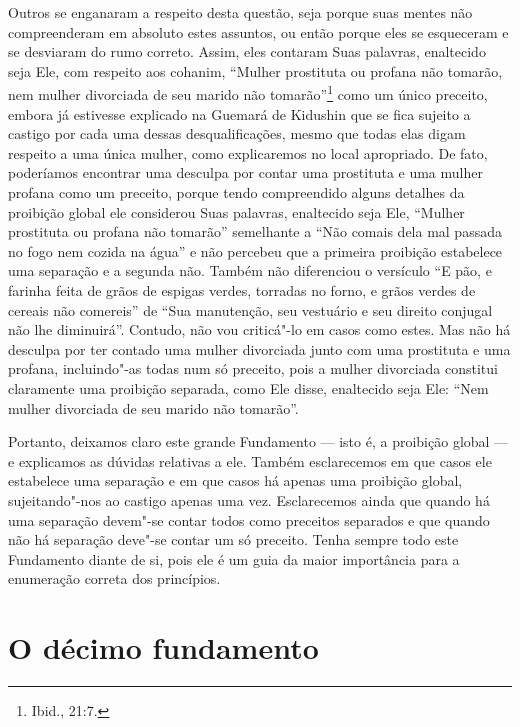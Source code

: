 Outros se enganaram a respeito desta questão, seja porque suas mentes
não compreenderam em absoluto estes assuntos, ou então porque eles se
esqueceram e se desviaram do rumo correto. Assim, eles contaram Suas
palavras, enaltecido seja Ele, com respeito aos cohanim\starr, ``Mulher
prostituta ou profana não tomarão, nem mulher divorciada de seu marido
não tomarão''\footnote{Ibid., 21:7.} como um único preceito, embora já estivesse
explicado na Guemará\starr{} de Kidushin\starr{} que se fica sujeito a castigo por cada
uma dessas desqualificações, mesmo que todas elas digam respeito a uma
única mulher, como explicaremos no local apropriado. De fato, poderíamos
encontrar uma desculpa por contar uma
prostituta e uma mulher profana como um preceito, porque tendo
compreendido alguns detalhes da proibição global ele considerou Suas
palavras, enaltecido seja Ele, ``Mulher prostituta ou profana não
tomarão'' semelhante a ``Não comais dela mal passada no fogo nem cozida
na água'' e não percebeu que a primeira proibição estabelece uma
separação e a segunda não. Também não diferenciou o versículo ``E pão,
e farinha feita de grãos de espigas verdes, torradas no forno, e grãos
verdes de cereais não comereis'' de ``Sua manutenção, seu vestuário e
seu direito conjugal não lhe diminuirá''. Contudo, não vou criticá"-lo
em casos como estes. Mas não há desculpa por ter contado uma mulher
divorciada junto com uma prostituta e uma profana, incluindo"-as todas
num só preceito, pois a mulher divorciada constitui claramente uma
proibição separada, como Ele disse, enaltecido seja Ele: ``Nem mulher
divorciada de seu marido não tomarão''.

Portanto, deixamos claro este grande Fundamento --- isto é, a proibição
global --- e explicamos as dúvidas relativas a ele. Também esclarecemos
em que casos ele estabelece uma separação e em que casos há apenas uma
proibição global, sujeitando"-nos ao castigo apenas uma vez.
Esclarecemos ainda que quando há uma separação devem"-se contar todos
como preceitos separados e que quando não há separação deve"-se contar um
só preceito. Tenha sempre todo este Fundamento diante de si, pois ele é
um guia da maior importância para a enumeração correta dos princípios.

\chapter*{O décimo fundamento}

